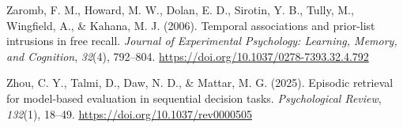 \documentclass[
  man,
  floatsintext,
  longtable,
  nolmodern,
  notxfonts,
  notimes,
  draftfirst,
  colorlinks=true,linkcolor=blue,citecolor=blue,urlcolor=blue]{apa7}
\newlength{\cslhangindent}
\newenvironment{CSLReferences}[2] %
 {\begin{list}{}{%
  \setlength{\itemindent}{0pt}
  \setlength{\leftmargin}{0pt}
  \setlength{\parsep}{0pt}
  \ifodd #1
   \setlength{\leftmargin}{\cslhangindent}
   \setlength{\itemindent}{-1\cslhangindent}
  \fi
  \setlength{\itemsep}{#2\baselineskip}}}
 {\end{list}}
\begin{document}
\begin{CSLReferences}{1}{0}
Zaromb, F. M., Howard, M. W., Dolan, E. D., Sirotin, Y. B., Tully, M.,
Wingfield, A., \& Kahana, M. J. (2006). Temporal associations and
prior-list intrusions in free recall. \emph{Journal of Experimental
Psychology: Learning, Memory, and Cognition}, \emph{32}(4), 792--804.
\url{https://doi.org/10.1037/0278-7393.32.4.792}

Zhou, C. Y., Talmi, D., Daw, N. D., \& Mattar, M. G. (2025). Episodic
retrieval for model-based evaluation in sequential decision tasks.
\emph{Psychological Review}, \emph{132}(1), 18--49.
\url{https://doi.org/10.1037/rev0000505}

\end{CSLReferences}
\end{document}
